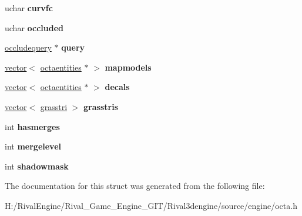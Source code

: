 \begin{DoxyCompactItemize}
uchar {\bfseries curvfc}
\item 
\mbox{\label{structvtxarray_ab69d377f96b820cb48b7178401af7a78}} 
uchar {\bfseries occluded}
\item 
\mbox{\label{structvtxarray_aaae6ee1e267d105974b506b9a1de9795}} 
\hyperlink{structoccludequery}{occludequery} $\ast$ {\bfseries query}
\item 
\mbox{\label{structvtxarray_a5fc99ffeafb428f23d13db87295c8273}} 
\hyperlink{structvector}{vector}$<$ \hyperlink{structoctaentities}{octaentities} $\ast$ $>$ {\bfseries mapmodels}
\item 
\mbox{\label{structvtxarray_ac94d0c15c1da6629d4e9a670ae461ddc}} 
\hyperlink{structvector}{vector}$<$ \hyperlink{structoctaentities}{octaentities} $\ast$ $>$ {\bfseries decals}
\item 
\mbox{\label{structvtxarray_a86ac3ac1d63d5012e629a6067442278d}} 
\hyperlink{structvector}{vector}$<$ \hyperlink{structgrasstri}{grasstri} $>$ {\bfseries grasstris}
\item 
\mbox{\label{structvtxarray_a446baa291c7bf07cb8a1eb810e5ecb24}} 
int {\bfseries hasmerges}
\item 
\mbox{\label{structvtxarray_a42a117d4209b1979e010d825716faff0}} 
int {\bfseries mergelevel}
\item 
\mbox{\label{structvtxarray_a38e0f2ed91520ed8dfcc551eadca9e80}} 
int {\bfseries shadowmask}
\end{DoxyCompactItemize}


The documentation for this struct was generated from the following file\+:\begin{DoxyCompactItemize}
\item 
H\+:/\+Rival\+Engine/\+Rival\+\_\+\+Game\+\_\+\+Engine\+\_\+\+G\+I\+T/\+Rival3dengine/source/engine/octa.\+h\end{DoxyCompactItemize}
